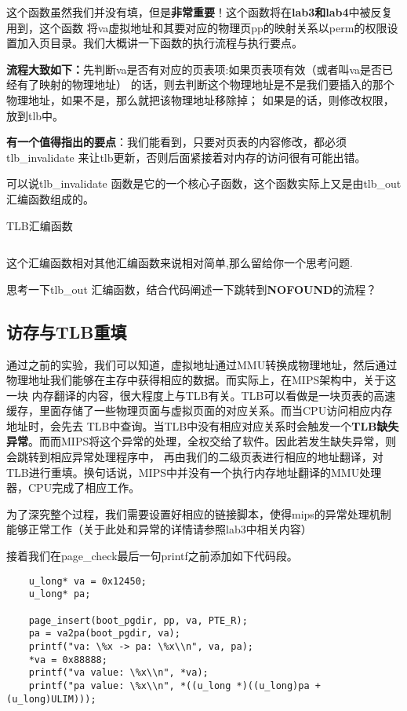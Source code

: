 这个函数虽然我们并没有填，但是\textbf{非常重要}！这个函数将在\textbf{lab3和lab4}中被反复用到，这个函数
将va虚拟地址和其要对应的物理页pp的映射关系以perm的权限设置加入页目录。我们大概讲一下函数的执行流程与执行要点。

\textbf{流程大致如下：}先判断va是否有对应的页表项:如果页表项有效（或者叫va是否已经有了映射的物理地址）
的话，则去判断这个物理地址是不是我们要插入的那个物理地址，如果不是，那么就把该物理地址移除掉；
如果是的话，则修改权限，放到tlb中。

\textbf{有一个值得指出的要点}：我们能看到，只要对页表的内容修改，都必须tlb\_invalidate 来让tlb更新，否则后面紧接着对内存的访问很有可能出错。

可以说tlb\_invalidate 函数是它的一个核心子函数，这个函数实际上又是由tlb\_out 汇编函数组成的。

\begin{codeBoxWithCaption}{TLB汇编函数\label{code:tlb_out.S}}
  \inputminted[linenos]{gas}{codes/tlb_out.S}
\end{codeBoxWithCaption}

这个汇编函数相对其他汇编函数来说相对简单,那么留给你一个思考问题.

\begin{thinking}\label{think-tlb}
思考一下tlb\_out 汇编函数，结合代码阐述一下跳转到\textbf{NOFOUND}的流程？
\end{thinking}
\subsection{访存与TLB重填}
  通过之前的实验，我们可以知道，虚拟地址通过MMU转换成物理地址，然后通过物理地址我们能够在主存中获得相应的数据。而实际上，在MIPS架构中，关于这一块
  内存翻译的内容，很大程度上与TLB有关。TLB可以看做是一块页表的高速缓存，里面存储了一些物理页面与虚拟页面的对应关系。而当CPU访问相应内存地址时，会先去
  TLB中查询。当TLB中没有相应对应关系时会触发一个\textbf{TLB缺失异常}。而而MIPS将这个异常的处理，全权交给了软件。因此若发生缺失异常，则会跳转到相应异常处理程序中，
  再由我们的二级页表进行相应的地址翻译，对TLB进行重填。换句话说，MIPS中并没有一个执行内存地址翻译的MMU处理器，CPU完成了相应工作。

  为了深究整个过程，我们需要设置好相应的链接脚本，使得mips的异常处理机制能够正常工作（关于此处和异常的详情请参照lab3中相关内容）

  接着我们在page\_check最后一句printf之前添加如下代码段。
  \begin{verbatim}
    u_long* va = 0x12450;
    u_long* pa;

    page_insert(boot_pgdir, pp, va, PTE_R);
    pa = va2pa(boot_pgdir, va);
    printf("va: \%x -> pa: \%x\\n", va, pa);
    *va = 0x88888;
    printf("va value: \%x\\n", *va);
    printf("pa value: \%x\\n", *((u_long *)((u_long)pa + (u_long)ULIM)));
  \end{verbatim}

